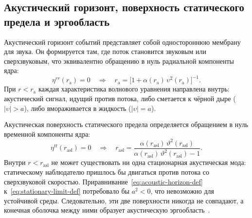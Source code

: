 \documentclass[12pt,a4paper,preprint]{elsarticle}
\begin{document}
        \subsection{Акустический горизонт, поверхность статического предела и эргообласть}\label{subsec:causal-surfaces}

            Акустический горизонт событий представляет собой одностороннюю мембрану для звука. Он формируется там, где поток становится звуковым или сверхзвуковым, что эквивалентно обращению в нуль радиальной компоненты ядра:
            \begin{equation}
                \eta^{rr}(r_{\mathrm{a}}) = 0 \quad \Longrightarrow \quad r_{\mathrm{a}} = \bigl[1 + \alpha(r_{\mathrm{a}})\,\upsilon^{2}(r_{\mathrm{a}})\bigr]^{-1} .
                \label{eq:acoustic-horizon-def}
            \end{equation}
            При $r<r_{\mathrm{a}}$ каждая характеристика волнового уравнения направлена внутрь: акустический сигнал, идущий против потока, либо сметается к чёрной дыре ($|\upsilon|>a$), либо вмораживается в жидкость ($|\upsilon|=a$).

            Акустическая поверхность статического предела определяется обращением в нуль временной компоненты ядра:
            \begin{equation}
                \eta^{tt}(r_{\mathrm{asl}}) = 0 \quad \Longrightarrow \quad r_{\mathrm{asl}} = \frac{\alpha(r_{\mathrm{asl}})\,\vartheta^{2}(r_{\mathrm{asl}})} {\alpha(r_{\mathrm{asl}})\,\vartheta^{2}(r_{\mathrm{asl}})-1} .
                \label{eq:stationary-limit-def}
            \end{equation}
            Внутри $r<r_{\mathrm{asl}}$ не может существовать ни одна стационарная акустическая мода: статическому наблюдателю пришлось бы двигаться против потока со сверхзвуковой скоростью. Приравнивание~\eqref{eq:acoustic-horizon-def} к~\eqref{eq:stationary-limit-def} потребовало бы $a^{2}<0$, что невозможно для устойчивой среды. Следовательно, эти две поверхности никогда не совпадают, а конечная оболочка между ними образует акустическую эргообласть~\cite{VisserM_AcousticBlackHolesHorizonsErgospheresAndHawkingRadiation_1998, BilicN_RelativisticAcousticGeometry_1999}.
\end{document}
